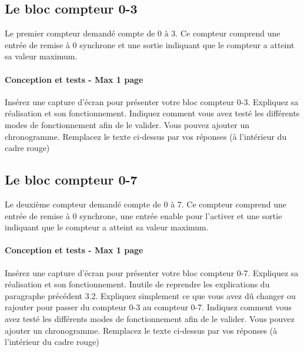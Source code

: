\documentclass[a4paper]{article} %
\begin{document}
\subsection{Le bloc compteur 0-3}
Le premier compteur demandé compte de 0 à 3. Ce compteur comprend une entrée de remise à 0 synchrone et une sortie indiquant que le compteur a atteint sa valeur maximum.
\begin{tcolorbox}[colframe=Monokaimagenta,colback=white]
\paragraph{Conception et tests - Max 1 page }
Insérez une capture d’écran pour présenter votre bloc compteur 0-3. Expliquez sa réalisation et son fonctionnement.
Indiquez comment vous avez testé les différents modes de fonctionnement afin de le valider. Vous pouvez ajouter un chronogramme.
Remplacez le texte ci-dessus par vos réponses (à l’intérieur du cadre rouge)
\\
\end{tcolorbox}
\subsection{Le bloc compteur 0-7}
Le deuxième compteur demandé compte de 0 à 7. Ce compteur comprend une entrée de remise à 0 synchrone, une entrée enable pour l’activer et une sortie indiquant que le compteur a atteint sa valeur maximum.
\begin{tcolorbox}[colframe=Monokaimagenta,colback=white]
\paragraph{Conception et tests - Max 1 page}
Insérez une capture d’écran pour présenter votre bloc compteur 0-7. Expliquez sa réalisation et son fonctionnement. Inutile de reprendre les explications du paragraphe précédent 3.2. Expliquez simplement ce que vous avez dû changer ou rajouter pour passer du compteur 0-3 au compteur 0-7.
Indiquez comment vous avez testé les différents modes de fonctionnement afin de le valider. Vous pouvez ajouter un chronogramme.
Remplacez le texte ci-dessus par vos réponses (à l’intérieur du cadre rouge)
\\
\end{tcolorbox}
\end{document}
